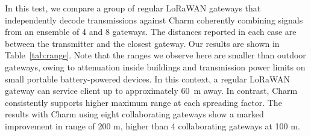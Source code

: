 In this test, we compare a group of regular LoRaWAN gateways that
independently decode transmissions against Charm coherently combining signals
from an ensemble of 4 and 8 gateways. The distances reported in each case are
between the transmitter and the closest gateway. Our results are shown in
Table~\ref{tab:range}. Note that the ranges we observe here are smaller than
outdoor gateways, owing to attenuation inside buildings and transmission power
limits on small portable battery-powered devices. In this context, a regular
LoRaWAN gateway can service client up to approximately 60~m away. In contrast,
Charm consistently supports higher maximum range at each spreading factor. The
results with Charm using eight collaborating gateways show a marked
improvement in range of 200 m, higher than 4 collaborating gateways at 100 m.




